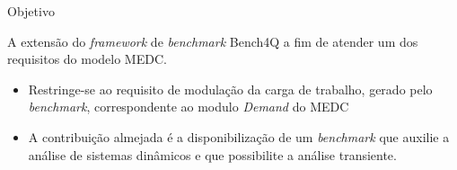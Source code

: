 \begin{frame}{Objetivo}
	\begin{block}{}{
			A extensão do \textit{framework} de \textit{benchmark} Bench4Q a fim de atender um dos requisitos do modelo MEDC. 
		}
		\begin{itemize}					
			\item Restringe-se ao requisito de modulação da carga de trabalho, gerado pelo \textit{benchmark}, correspondente ao modulo \textit{Demand} do MEDC
			
			\item A contribuição almejada é a disponibilização de um \textit{benchmark} que auxilie a análise de sistemas dinâmicos e que possibilite a análise transiente.
		\end{itemize}
	\end{block}	
\end{frame}	